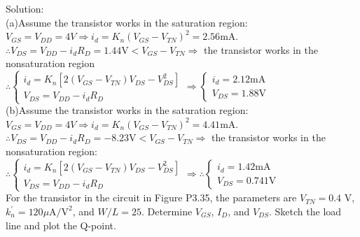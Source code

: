 \documentclass[a4paper,11pt,UTF8]{article}
\begin{document}
\noindent Solution:\\
(a)Assume the transistor works in the saturation region:\\
$V_{GS}=V_{DD}=4V\Rightarrow i_{d}=K_n(V_{GS}-V_{TN})^2=2.56$mA.\\
$\therefore V_{DS}=V_{DD}-i_{d}R_{D}=1.44$V$<V_{GS}-V_{TN}\Rightarrow$ the transistor works in the nonsaturation region\\
$\therefore \begin{cases}
	i_{d}=K_n\left[2(V_{GS}-V_{TN})V_{DS}-V^2_{DS}\right]\\
	V_{DS}=V_{DD}-i_{d}R_{D}
\end{cases}\Rightarrow
\begin{cases}
	i_{d}=2.12\text{mA}\\
	V_{DS}=1.88\text{V}
\end{cases}$\\
(b)Assume the transistor works in the saturation region:\\
$V_{GS}=V_{DD}=4V\Rightarrow i_{d}=K_n(V_{GS}-V_{TN})^2=4.41$mA.\\
$\therefore V_{DS}=V_{DD}-i_{d}R_{D}=-8.23$V$<V_{GS}-V_{TN}\Rightarrow$ the transistor works in the nonsaturation region:\\
$\therefore \begin{cases}
	i_{d}=K_n\left[2(V_{GS}-V_{TN})V_{DS}-V^2_{DS}\right]\\
	V_{DS}=V_{DD}-i_{d}R_{D}
\end{cases}\Rightarrow
\therefore \begin{cases}
	i_{d}=1.42\text{mA}\\
	V_{DS}=0.741\text{V} 
\end{cases}
$\\
 For the transistor in the circuit in Figure P3.35, the parameters are
$V_{T N} = 0.4$ V, $k^{\prime}_n= 120\mu\text{A/V}^2$, and $W/L = 25$. Determine $V_{GS}$, $I_D$, and $V_{DS}$. Sketch the load line and plot the Q-point.
\end{document}
